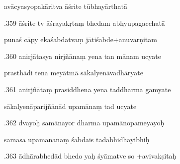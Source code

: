 \documentclass[article,12pt,a4paper]{memoir}%
\newcounter{parCount}
\begin{document}
	  
	  \pstart \leavevmode%
	avācyasyopakāritva āśrite tūbhayārthatā 
	{}
	\pend%
      

	  
	  \pstart {}.359 āśrite tv āśrayakṛtaṃ bhedam abhyupagacchatā 
	{}
	\pend%
      

	  
	  \pstart \leavevmode%
	punaś cāpy ekaśabdatvaṃ jātiśabde+anuvarṇitam 
	{}
	\pend%
      

	  
	  \pstart {}.360 anirjātasya nirjñānaṃ yena tan mānam ucyate 
	{}
	\pend%
      

	  
	  \pstart \leavevmode%
	prasthādi tena meyātmā sākalyenāvadhāryate 
	{}
	\pend%
      

	  
	  \pstart {}.361 anirjñātaṃ prasiddhena yena taddharma gamyate 
	{}
	\pend%
      

	  
	  \pstart \leavevmode%
	sākalyenāparijñānād upamānaṃ tad ucyate 
	{}
	\pend%
      

	  
	  \pstart {}.362 dvayoḥ samānayor dharma upamānopameyayoḥ 
	{}
	\pend%
      

	  
	  \pstart \leavevmode%
	samāsa upamānānāṃ śabdais tadabhidhāyibhiḥ 
	{}
	\pend%
      

	  
	  \pstart {}.363 ādhārabhedād bhedo yaḥ śyāmatve so +avivakṣitaḥ 
	{}
	\pend%
      
\end{document}
